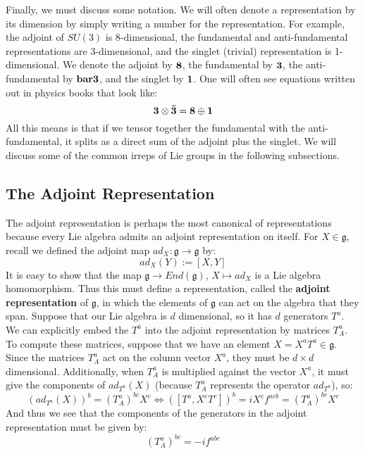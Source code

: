 \documentclass[11pt, oneside]{article}   	%
\theoremstyle{definition}
\begin{document}
Finally, we must discuss some notation. We will often denote a representation by its dimension 
by simply writing a number for the representation. For example, the adjoint of $SU(3)$ is 8-dimensional, the fundamental 
and anti-fundamental representations are 3-dimensional, and the singlet (trivial) representation is 1-dimensional. We denote the 
adjoint by $\bf{8}$, the fundamental by $\bf 3$, the anti-fundamental by $\bf{bar 3}$, and the singlet by $\bf 1$. One will often 
see equations written out in physics books that look like:
\begin{equation}
	\bf 3\otimes \bar{3} = 8\oplus 1
\end{equation}
All this means is that if we tensor together the fundamental with the anti-fundamental, it splits as a direct sum of the adjoint 
plus the singlet. We will discuss some of the common irreps of Lie groups in the following subsections.

\subsection{The Adjoint Representation}

The adjoint representation is perhaps the most canonical of representations because every Lie 
algebra admits an adjoint representation on itself. For $X\in\mathfrak g$, recall we defined the adjoint 
map $ad_X : \mathfrak g\rightarrow\mathfrak g$ by:
\begin{equation}
	ad_X(Y) := [X, Y]
\end{equation}
It is easy to show that the map $\mathfrak g\rightarrow End(\mathfrak g)$, $X\mapsto ad_X$ is a 
Lie algebra homomorphism. Thus this must define a representation, called the \textbf{adjoint 
representation} of $\mathfrak g$, in which the elements of $\mathfrak g$ can act on the algebra 
that they span. Suppose that our Lie algebra is $d$ dimensional, so it has $d$ generators $T^a$. 
We can explicitly embed the $T^a$ into the adjoint representation by matrices $T_A^a$. To 
compute these matrices, suppose that we have an element $X = X^a T^a\in\mathfrak g$. Since the 
matrices $T_A^a$ act on the column vector $X^a$, they must be $d\times d$ dimensional. Additionally, 
when $T_A^a$ is multiplied against the vector $X^a$, it must give the components of 
$ad_{T^a}(X)$ (because $T^a_A$ represents the operator $ad_{T^a}$), so:
\begin{equation}
	(ad_{T^a}(X))^b = (T_A^a)^{bc} X^c\iff ([T^a, X^c T^c])^b = iX^c f^{acb} = (T_A^a)^{bc} X^c
\end{equation}
And thus we see that the components of the generators in the adjoint representation must be given by:
\begin{equation}
	(T_A^a)^{bc} = -if^{abc}
\end{equation}
\end{document}
